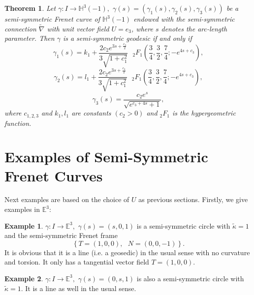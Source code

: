 \documentclass{amsart}
\theoremstyle{plain}
\newtheorem{theorem}{Theorem}
\theoremstyle{definition}
\newtheorem{example}{Example}
\theoremstyle{remark}
\numberwithin{equation}{section}
\begin{document}
\begin{theorem}
Let $\gamma :I\rightarrow \mathbb{H}^{3}(-1),$ $\gamma (s)=\left( \gamma
_{1}(s),\gamma _{2}(s),\gamma _{3}(s)\right) $ be a semi-symmetric Frenet
curve of $\mathbb{H}^{3}(-1)$ endowed with the semi-symmetric connection $%
\widetilde{\nabla }$ with unit vector field $U=e_{3}$, where $s$ denotes the
arc-length parameter. Then $\gamma $ is a semi-symmetric geodesic if and
only if 
\begin{equation*}
\gamma _{1}(s)=k_{1}+\frac{2c_{2}e^{3s+\frac{c_{3}}{2}}}{3\sqrt{1+c_{1}^{2}}}%
\text{ }_{2}F_{1}\left( \frac{3}{4},\frac{3}{2},\frac{7}{4}%
;-e^{4s+c_{3}}\right) ,
\end{equation*}%
\begin{equation*}
\gamma _{2}(s)=l_{1}+\frac{2c_{2}e^{3s+\frac{c_{3}}{2}}}{3\sqrt{1+c_{1}^{2}}}%
\text{ }_{2}F_{1}\left( \frac{3}{4},\frac{3}{2},\frac{7}{4}%
;-e^{4s+c_{3}}\right) ,
\end{equation*}%
\begin{equation*}
\gamma _{3}(s)=\frac{c_{2}e^{s}}{\sqrt{e^{c_{3}+4s}+1}},
\end{equation*}%
where $c_{1,2,3}$ and $k_{1},l_{1}$ are constants $\left( c_{2}>0\right) $
and $_{2}F_{1}$ is the hypergeometric function.
\end{theorem}

\section{\label{sect-examples}Examples of Semi-Symmetric Frenet Curves}

Next examples are based on the choice of $U$ as previous sections. Firstly,
we give examples in $\mathbb{E}^{3}$:

\begin{example}
$\gamma :I\rightarrow \mathbb{E}^{3},$ $\gamma \left( s\right) =\left(
s,0,1\right) $ is a semi-symmetric circle with $\widetilde{\kappa }=1$ and
the semi-symmetric Frenet frame%
\begin{equation*}
\left\{ T=\left( 1,0,0\right) ,\text{ }N=(0,0,-1)\right\} .
\end{equation*}%
It is obvious that it is a line (i.e. a geosedic) in the usual sense with no
curvature and torsion. It only has a tangential vector field $T=\left(
1,0,0\right) .$
\end{example}

\begin{example}
$\gamma :I\rightarrow \mathbb{E}^{3},$ $\gamma \left( s\right) =\left(
0,s,1\right) $ is also a semi-symmetric circle with $\widetilde{\kappa }=1.$
It is a line as well in the usual sense.
\end{example}
\end{document}
